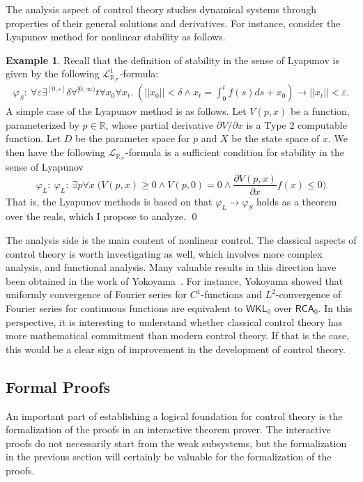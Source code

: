 \documentclass[10pt]{article}
\newcommand{\lrf}{\mathcal{L}_{\mathbb{R}_{\mathcal{F}}}}
\theoremstyle{definition}
\newtheorem{example}{Example}[section]
\begin{document}
The analysis aspect of control theory studies dynamical systems through properties of their general solutions and derivatives. For instance, consider the Lyapunov method for nonlinear stability as follows. 
\begin{example}
Recall that the definition of stability in the sense of Lyapunov is given by the following $\lrf^1$-formula:
\begin{eqnarray*}
\varphi_S:\ \forall\varepsilon\exists^{[0,\varepsilon]} \delta \forall^{[0,\infty)} t\forall x_0\forall x_t .\; (||x_0||<\delta \wedge x_t = \int_0^t f(s)ds + x_0 )\rightarrow ||x_t||<\varepsilon.
\end{eqnarray*}
A simple case of the Lyapunov method is as follows. Let $V(p,x)$ be a function, parameterized by $p\in \mathbb{R}$, whose partial derivative ${\partial V}/{\partial x}$ is a Type 2 computable function. Let $D$ be the parameter space for $p$ and $X$ be the state space of $x$. We then have the following $\lrf$-formula is a sufficient condition for stability in the sense of Lyapunov
$$\varphi_L:\ \varphi_L:\ \exists p\forall x\; \bigg(V(p,x)\geq 0 \wedge V(p,0) = 0\wedge \frac{\partial V(p,x)}{\partial x}f(x)\leq 0\bigg)$$
That is, the Lyapunov methods is based on that $\varphi_L\rightarrow \varphi_S$ holds as a theorem over the reals, which I propose to analyze. \qed
\end{example}
The analysis side is the main content of nonlinear control. The classical aspects of control theory is worth investigating as well, which involves more complex analysis, and functional analysis. Many valuable results in this direction have been obtained in the work of Yokoyama~\cite{yoko}. For instance, Yokoyama showed that uniformly convergence of Fourier series for $C^1$-functions and $L^2$-convergence of Fourier series for continuous functions are equivalent to $\mathsf{WKL}_0$ over $\mathsf{RCA}_0$. In this perspective, it is interesting to understand whether classical control theory has more mathematical commitment than modern control theory. If that is the case, this would be a clear sign of improvement in the development of control theory. 

\subsection{Formal Proofs}

An important part of establishing a logical foundation for control theory is the formalization of the proofs in an interactive theorem prover. The interactive proofs do not necessarily start from the weak subsystems, but the formalization in the previous section will certainly be valuable for the formalization of the proofs. 
\end{document}
